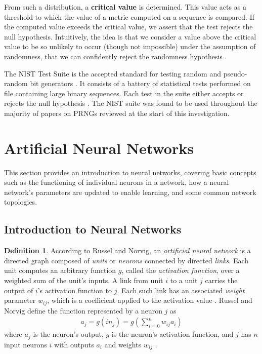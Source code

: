 \documentclass[12pt, titlepage]{report}
\theoremstyle{definition}
\newtheorem{definition}{Definition}
\begin{document}
From such a distribution, a \textbf{critical value} is determined. This value acts as a threshold to which the value of a metric computed on a sequence is compared. If the computed value exceeds the critical value, we assert that the test rejects the null hypothesis. Intuitively, the idea is that we consider a value above the critical value to be so unlikely to occur (though not impossible) under the assumption of randomness, that we can confidently reject the randomness hypothesis \cite[p. 1.3]{rukhin2001statistical}.

The NIST Test Suite is the accepted standard for testing random and pseudo-random bit generators \cite{lavasani2009practical}. It consists of a battery of statistical tests performed on file containing large binary sequences. Each test in the suite either accepts or rejects the null hypothesis \cite{rukhin2001statistical}. The NIST suite was found to be used throughout the majority of papers on PRNGs reviewed at the start of this investigation.




\section{Artificial Neural Networks}
This section provides an introduction to neural networks, covering basic concepts such as the functioning of individual neurons in a network, how a neural network's parameters are updated to enable learning, and some common network topologies.


\subsection{Introduction to Neural Networks}\label{subsection:neural_intro}
\begin{definition}
According to Russel and Norvig, an \emph{artificial neural network} is a directed graph composed of \emph{units} or \emph{neurons} connected by directed \emph{links}. Each unit computes an arbitrary function $g$, called the \emph{activation function}, over a weighted sum of the unit's inputs. A link from unit $i$ to a unit $j$ carries the output of $i$'s activation function to $j$. Each such link has an associated \emph{weight} parameter $w_{ij}$, which is a coefficient applied to the activation value \cite[p. 727-731]{russel2009artificial}. Russel and Norvig define the function represented by a neuron $j$ as
\begin{gather}\label{eq:activation}
a_j = g(in_j) = g\left(\sum_{i=0}^{n} w_{ij}a_i\right)
\end{gather}
where $a_j$ is the neuron's output, $g$ is the neuron's activation function, and $j$ has $n$ input neurons $i$ with outputs $a_i$ and weights $w_{ij}$ \cite[p. 728]{russel2009artificial}.
\end{definition}
\end{document}
